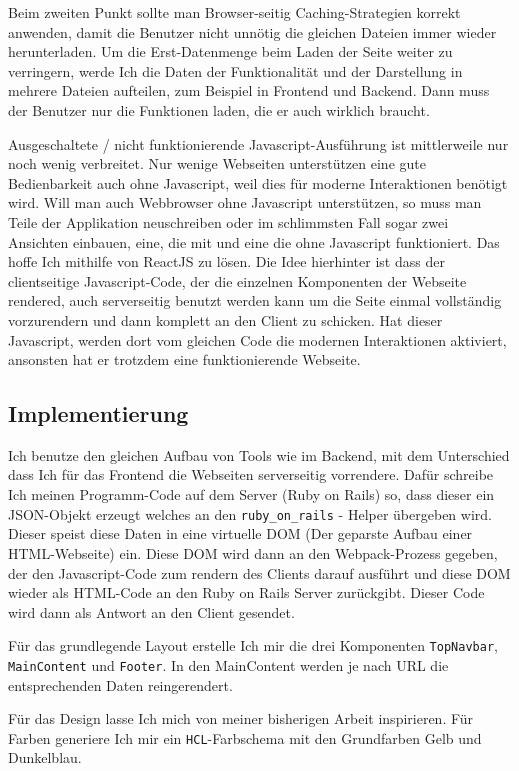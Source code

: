 \documentclass[a4paper,10pt]{scrartcl}
\begin{document}
    Beim zweiten Punkt sollte man Browser-seitig Caching-Strategien korrekt
    anwenden, damit die Benutzer nicht unnötig die gleichen Dateien immer wieder
    herunterladen.
    Um die Erst-Datenmenge beim Laden der Seite weiter zu verringern, werde Ich
    die Daten der Funktionalität und der Darstellung in mehrere Dateien
    aufteilen, zum Beispiel in Frontend und Backend.
    Dann muss der Benutzer nur die Funktionen laden, die er auch wirklich
    braucht.

    Ausgeschaltete / nicht funktionierende Javascript-Ausführung ist
    mittlerweile nur noch wenig verbreitet.
    Nur wenige Webseiten unterstützen eine gute Bedienbarkeit auch ohne
    Javascript, weil dies für moderne Interaktionen benötigt wird.
    Will man auch Webbrowser ohne Javascript unterstützen, so muss man Teile
    der Applikation neuschreiben oder im schlimmsten Fall sogar zwei Ansichten
    einbauen, eine, die mit und eine die ohne Javascript funktioniert.
    Das hoffe Ich mithilfe von ReactJS zu lösen.
    Die Idee hierhinter ist dass der clientseitige Javascript-Code, der die
    einzelnen Komponenten der Webseite rendered, auch serverseitig benutzt
    werden kann um die Seite einmal  vollständig vorzurendern und dann komplett
    an den Client zu schicken.
    Hat dieser Javascript, werden dort vom gleichen Code die modernen
    Interaktionen aktiviert, ansonsten hat er trotzdem eine funktionierende
    Webseite.

  \subsection{Implementierung}

    Ich benutze den gleichen Aufbau von Tools wie im Backend, mit dem
    Unterschied dass Ich für das Frontend die Webseiten serverseitig vorrendere.
    Dafür schreibe Ich meinen Programm-Code auf dem Server (Ruby on Rails) so,
    dass dieser ein JSON-Objekt erzeugt welches an den
    \lstinline{ruby_on_rails} - Helper übergeben wird.
    Dieser speist diese Daten in eine virtuelle DOM (Der geparste Aufbau einer
    HTML-Webseite) ein.
    Diese DOM wird dann an den Webpack-Prozess gegeben, der den Javascript-Code
    zum rendern des Clients darauf ausführt und diese DOM wieder als HTML-Code
    an den Ruby on Rails Server zurückgibt.
    Dieser Code wird dann als Antwort an den Client gesendet.

    Für das grundlegende Layout erstelle Ich mir die drei Komponenten
    \lstinline{TopNavbar}, \newline \lstinline{MainContent} und
    \lstinline{Footer}.
    In den MainContent werden je nach URL die entsprechenden Daten
    reingerendert.

    Für das Design lasse Ich mich von meiner bisherigen Arbeit inspirieren.
    Für Farben generiere Ich mir ein \lstinline{HCL}-Farbschema mit den
    Grundfarben Gelb und Dunkelblau.
\end{document}
